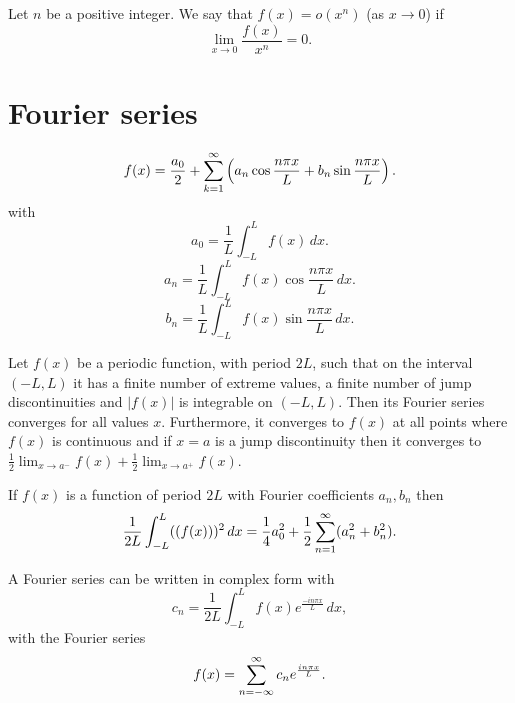 \documentclass[10pt, a4paper]{article}
\begin{document}
\begin{definition}
    Let $n$ be a positive integer.
    We say that $f(x) = o(x ^ n)$ (as $x \rightarrow 0$)
    if
    \[
    \lim_{x \rightarrow 0}\frac{f(x)}{x ^ n} = 0.
    \]
\end{definition}

\newpage

\section{Fourier series}

\begin{definition}
    \[
    f(x) = \frac{a_0}{2} + \infsum\left(a_n\cos\frac{n\pi x}{L} + b_n\sin\frac{n\pi x}{L}\right).
    \]
    with
    \[
    a_0 = \frac{1}{L}\int_{-L}^{L}f(x)\,dx.
    \]
    \[
    a_n = \frac{1}{L}\int_{-L}^{L}f(x)\cos\frac{n\pi x}{L}\,dx.
    \]
    \[
    b_n = \frac{1}{L}\int_{-L}^{L}f(x)\sin\frac{n\pi x}{L}\,dx.
    \]
\end{definition}

\begin{theorem}
    Let $f(x)$ be a periodic function,
    with period $2L$,
    such that on the interval $(-L, L)$ it has a finite number of extreme values,
    a finite number of jump discontinuities and $|f(x)|$ is integrable on $(-L, L)$.
    Then its Fourier series converges for all values $x$.
    Furthermore,
    it converges to $f(x)$ at all points where $f(x)$ is continuous and if $x = a$ is a jump discontinuity then it converges to $\frac{1}{2}\lim_{x \rightarrow a ^ {-}}f(x) + \frac{1}{2}\lim_{x \rightarrow a ^ {+}}f(x)$.
\end{theorem}

\hfill

\begin{theorem}
    If $f(x)$ is a function of period $2L$ with Fourier coefficients $a_n, b_n$ then
    \[
    \frac{1}{2L}\int_{-L}^{L}((f(x))) ^ 2\,dx = \frac{1}{4}a_0 ^ 2 + \frac{1}{2}\infsum[n = 1](a_n ^ 2 + b_n ^ 2).
    \]
\end{theorem}

\begin{proposition}
    A Fourier series can be written in complex form with
    \[
    c_n = \frac{1}{2L}\int_{-L}^{L}f(x)e ^ {\frac{-in\pi x}{L}}\,dx,
    \]
    with the Fourier series
    \[
    f(x) = \infsum[n = -\infty]c_ne ^ {\frac{in\pi x}{L}}.
    \]
\end{proposition}
\end{document}
